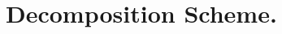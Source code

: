\section{Decomposition Scheme.}
\label{sec:methods}
\begin{comment}\subsection{Decomposition Rationale.}
%
The numerical resolution of hyperbolic\footnote{Hyperbolic PDEs are those that depend on at most the first-order partial derivatives of the vector field under consideration.} HJ PDEs~\cite{Mitchell2020} in a viscosity sense comes from the resolution of scalar continuous conservation laws e.g. the conservation of electric charge density, $\rho$ (in $\text{Coulombs}/m^{2}$), of an electromagnetic field  i.e.,
%
\begin{align}
\dfrac{\partial \rho}{\partial t} +(\nabla \cdot \bm{J}) = 0
\label{eq:conserve}
\end{align}
%
where $\bm{J}$ is the current density (in $Amperes/m^{2}$). If we relax the viscous properties of these conservation laws, they are effectively reduced to compressible inviscid  Euler equations with discontinuities~\cite{LevelSetsBook}. The discontinuities in the Euler dynamics of such inviscid conservation equations make their  resolution extendable to the numerical solution of HJI PDEs. We restate the following culminations from \cite{OsherShuENO} to build the case for our decomposition scheme.
%
\begin{remark}
The solution (\eg $\rho$ from \eqref{eq:conserve}) to a conservation law is tantamount to the derivative of the solution to an HJ PDE \textbf{along a single spatial dimension}.
\end{remark}
%
%
\begin{remark}
The solution of an HJ PDE, e.g. $\bm{u}$ or $\bm{v}$ in \eqref{eq:lower_visc}, \textbf{along a single spatial dimension}, is the integral of the solution of a scalar conservative equation, \eg $\rho$ in \eqref{eq:conserve}.
\label{rem:integral_conserve}
\end{remark}
%

\end{comment}
